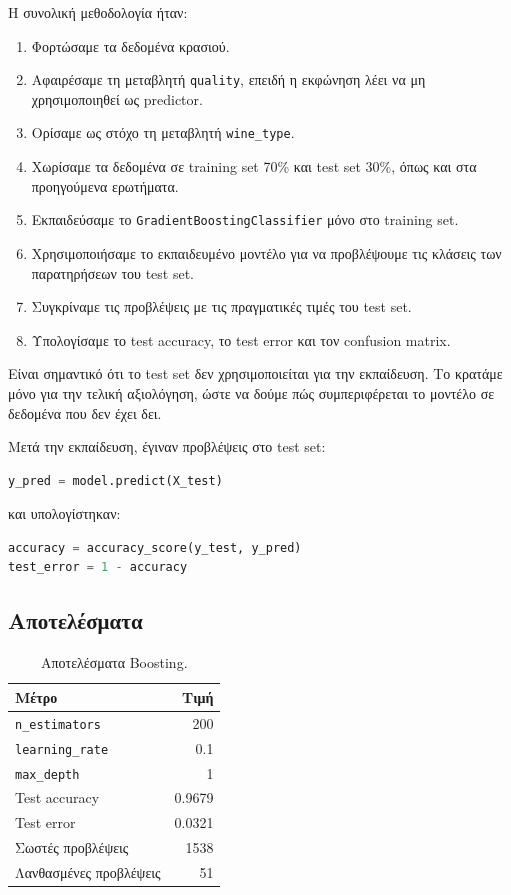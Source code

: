 \documentclass[12pt,a4paper]{article}
\newcommand{\code}[1]{\texttt{\textenglish{#1}}}
\begin{document}
Η συνολική μεθοδολογία ήταν:

\begin{enumerate}
    \item Φορτώσαμε τα δεδομένα κρασιού.
    \item Αφαιρέσαμε τη μεταβλητή \code{quality}, επειδή η εκφώνηση λέει να μη
    χρησιμοποιηθεί ως predictor.
    \item Ορίσαμε ως στόχο τη μεταβλητή \code{wine\_type}.
    \item Χωρίσαμε τα δεδομένα σε training set 70\% και test set 30\%, όπως και
    στα προηγούμενα ερωτήματα.
    \item Εκπαιδεύσαμε το \code{GradientBoostingClassifier} μόνο στο training
    set.
    \item Χρησιμοποιήσαμε το εκπαιδευμένο μοντέλο για να προβλέψουμε τις
    κλάσεις των παρατηρήσεων του test set.
    \item Συγκρίναμε τις προβλέψεις με τις πραγματικές τιμές του test set.
    \item Υπολογίσαμε το test accuracy, το test error και τον confusion matrix.
\end{enumerate}

Είναι σημαντικό ότι το test set δεν χρησιμοποιείται για την εκπαίδευση. Το
κρατάμε μόνο για την τελική αξιολόγηση, ώστε να δούμε πώς συμπεριφέρεται το
μοντέλο σε δεδομένα που δεν έχει δει.

Μετά την εκπαίδευση, έγιναν προβλέψεις στο test set:

\begin{lstlisting}[language=Python]
y_pred = model.predict(X_test)
\end{lstlisting}

και υπολογίστηκαν:

\begin{lstlisting}[language=Python]
accuracy = accuracy_score(y_test, y_pred)
test_error = 1 - accuracy
\end{lstlisting}

\subsection{Αποτελέσματα}

\begin{table}[H]
\centering
\caption{Αποτελέσματα Boosting.}
\begin{tabular}{lr}
\toprule
\textbf{Μέτρο} & \textbf{Τιμή} \\
\midrule
\code{n\_estimators} & 200 \\
\code{learning\_rate} & 0.1 \\
\code{max\_depth} & 1 \\
Test accuracy & 0.9679 \\
Test error & 0.0321 \\
Σωστές προβλέψεις & 1538 \\
Λανθασμένες προβλέψεις & 51 \\
\bottomrule
\end{tabular}
\end{table}
\end{document}
